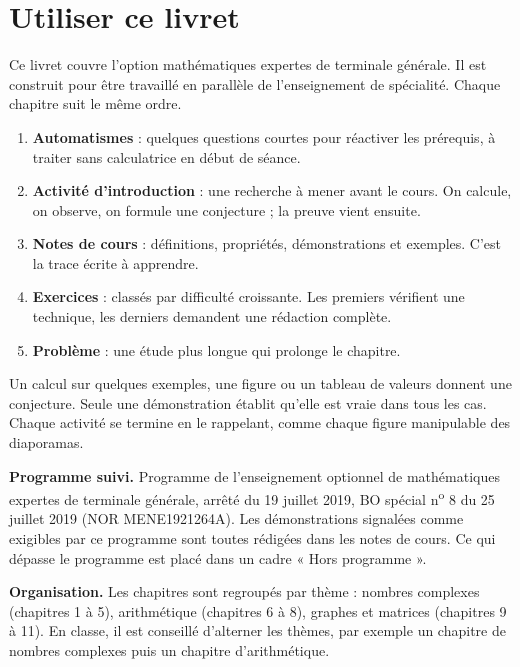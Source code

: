 \frontmatter
\chapter*{Utiliser ce livret}
Ce livret couvre l'option mathématiques expertes de terminale générale. Il est construit pour être travaillé en parallèle de l'enseignement de spécialité. Chaque chapitre suit le même ordre.
\begin{enumerate}
\item \textbf{Automatismes} : quelques questions courtes pour réactiver les prérequis, à traiter sans calculatrice en début de séance.
\item \textbf{Activité d'introduction} : une recherche à mener avant le cours. On calcule, on observe, on formule une conjecture ; la preuve vient ensuite.
\item \textbf{Notes de cours} : définitions, propriétés, démonstrations et exemples. C'est la trace écrite à apprendre.
\item \textbf{Exercices} : classés par difficulté croissante. Les premiers vérifient une technique, les derniers demandent une rédaction complète.
\item \textbf{Problème} : une étude plus longue qui prolonge le chapitre.
\end{enumerate}
\begin{keypoint}
Un calcul sur quelques exemples, une figure ou un tableau de valeurs donnent une conjecture. Seule une démonstration établit qu'elle est vraie dans tous les cas. Chaque activité se termine en le rappelant, comme chaque figure manipulable des diaporamas.
\end{keypoint}
\textbf{Programme suivi.} Programme de l'enseignement optionnel de mathématiques expertes de terminale générale, arrêté du 19 juillet 2019, BO spécial n\textsuperscript{o} 8 du 25 juillet 2019 (NOR MENE1921264A). Les démonstrations signalées comme exigibles par ce programme sont toutes rédigées dans les notes de cours. Ce qui dépasse le programme est placé dans un cadre « Hors programme ».

\textbf{Organisation.} Les chapitres sont regroupés par thème : nombres complexes (chapitres 1 à 5), arithmétique (chapitres 6 à 8), graphes et matrices (chapitres 9 à 11). En classe, il est conseillé d'alterner les thèmes, par exemple un chapitre de nombres complexes puis un chapitre d'arithmétique.
\ifmxteacher
\mxnewpage
